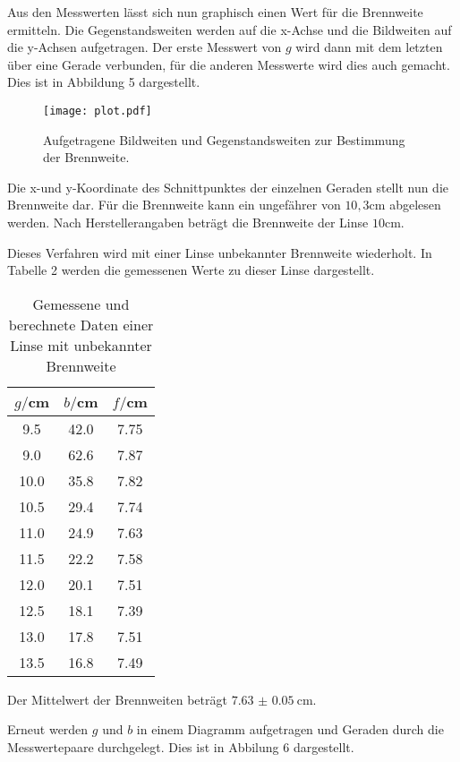 Aus den Messwerten lässt sich nun graphisch einen Wert für die Brennweite ermitteln. Die Gegenstandsweiten
werden auf die x-Achse und die Bildweiten auf die y-Achsen aufgetragen. Der erste Messwert von $g$ wird dann mit
dem letzten über eine Gerade verbunden, für die anderen Messwerte wird dies auch gemacht. Dies ist in
Abbildung 5 dargestellt.




\begin{figure}[H]
  \centering
  \texttt{[image: plot.pdf]}
  \caption{Aufgetragene Bildweiten und Gegenstandsweiten zur Bestimmung der Brennweite.}
  \label{fig:plot}
\end{figure}


Die x-und y-Koordinate des Schnittpunktes der einzelnen Geraden stellt nun die Brennweite dar. Für die Brennweite kann
ein ungefährer von $10,3$cm abgelesen werden. Nach Herstellerangaben beträgt die Brennweite der Linse $10$cm.



Dieses Verfahren wird mit einer Linse unbekannter Brennweite wiederholt. In Tabelle 2 werden
die gemessenen Werte zu dieser Linse dargestellt.

\begin{table}[H]
  \centering
  \caption{Gemessene und berechnete Daten einer Linse mit unbekannter Brennweite}
  \label{tab:Widerstand}
  \begin{tabular}{c c c}
    \toprule
    $g/$cm  & $b/$cm & $f/$cm \\
    \midrule
    9.5     &     42.0 & 7.75 \\
    9.0     &     62.6 & 7.87 \\
    10.0    &     35.8 & 7.82 \\
    10.5    &     29.4 & 7.74 \\
    11.0    &     24.9 & 7.63 \\
    11.5    &     22.2 & 7.58 \\
    12.0    &     20.1 & 7.51 \\
    12.5    &     18.1 & 7.39 \\
    13.0    &     17.8 & 7.51 \\
    13.5    &     16.8 & 7.49 \\
    \bottomrule
  \end{tabular}
\end{table}

Der Mittelwert der Brennweiten beträgt $\SI{7.63(5)}{\centi\meter}$.

Erneut werden $g$ und $b$ in einem Diagramm aufgetragen und Geraden durch die Messwertepaare durchgelegt. Dies ist in Abbilung 6
dargestellt.

